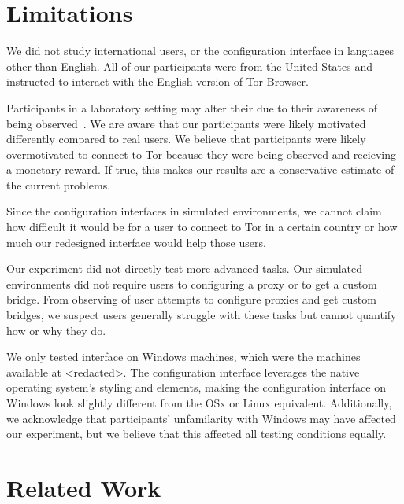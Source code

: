 \documentclass[USenglish,oneside,twocolumn]{article}
\begin{document}
\section{Limitations}
\label{sec:limitations}
We did not study international users, or the configuration interface in languages other than English. All of our participants were from the United States and instructed to interact with the English version of Tor Browser.

Participants in a laboratory setting may alter their due to their awareness of being observed~\cite{mccarney2007hawthorne}. We are aware that our participants were likely motivated differently compared to real users. We believe that participants were likely overmotivated to connect to Tor because they were being observed and recieving a monetary reward. If true, this makes our results are a conservative estimate of the current problems. 

Since the configuration interfaces in simulated environments, we cannot claim how difficult it would be for a user to connect to Tor in a certain country or how much our redesigned interface would help those users.  

Our experiment did not directly test more advanced tasks. Our simulated environments did not require users to configuring a proxy or to get a custom bridge. From observing of user attempts to configure proxies and get custom bridges, we suspect users generally struggle with these tasks but cannot quantify how or why they do. 

We only tested interface on Windows machines, which were the machines available at <redacted>. %
The configuration interface leverages the native operating system's styling and elements, making the configuration interface on Windows look slightly different from the OSx or Linux equivalent. Additionally, we acknowledge that participants' unfamilarity with Windows may have affected our experiment, but we believe that this affected all testing conditions equally.  

\section{Related Work}
\label{sec:related} 
\end{document}
